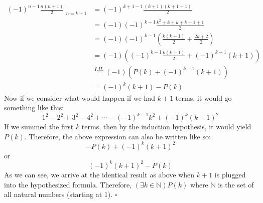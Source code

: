 \documentclass[12pt]{exam}
\begin{document}
\begin{questions}
{\begin{minipage}[t]{14.55cm}
			\begin{center}
				\begin{align*}
					(-1)^{n-1} \frac{n(n+1)}{2} |_{n=k+1} &= (-1)^{k+1-1} \frac{(k+1)(k+1+1)}{2} \\
					&= (-1)(-1)^{k-1} \frac{k^{2}+k+k+k+1+1}{2} \\
					&= (-1)(-1)^{k-1}\left(\frac{k(k+1)}{2} + \frac{2k+2}{2}\right) \\
					&= (-1)\left((-1)^{k-1}\frac{k(k+1)}{2}+(-1)^{k-1}(k+1)\right) \\
					&\stackrel{I.H.}{=} (-1)\left(P(k)+(-1)^{k-1}(k+1)\right) \\
					&= (-1)^{k}(k+1)-P(k)
				\end{align*}
				Now if we consider what would happen if we had $k+1$ terms, it would go something like this:
				$$1^{2}-2^{2}+3^{2}-4^{2}+ \cdots -(-1)^{k-1}k^{2}+(-1)^{k}(k+1)^{2}$$
				If we summed the first $k$ terms, then by the induction hypothesis, it would yield $P(k)$. Therefore, the above expression can also be written like so:
				$$-P(k)+(-1)^{k}(k+1)^{2}$$
				or
				$$(-1)^{k}(k+1)^{2}-P(k)$$
				As we can see, we arrive at the identical result as above when $k+1$ is plugged into the hypothesized formula. Therefore, $(\exists k \in \mathbb{N})P(k)$ where $\mathbb{N}$ is the set of all natural numbers (starting at 1). $\square$
			\end{center}
			
			\vspace{25pt}
			\end{minipage}
		}		
	
\end{questions}
\end{document}
